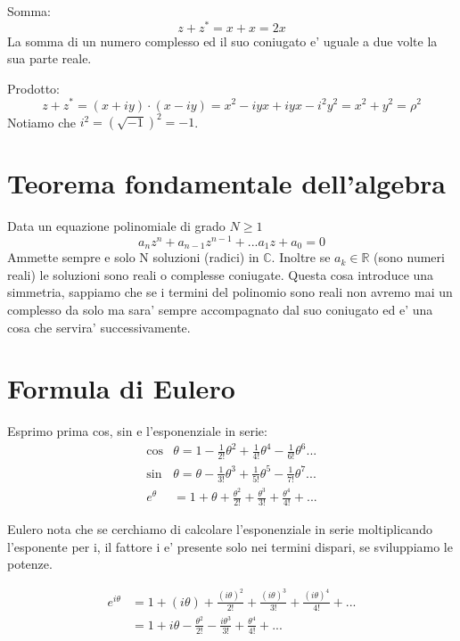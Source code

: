 Somma:
\begin{equation}
    z + z^* = x + x = 2x
\end{equation}
La somma di un numero complesso ed il suo coniugato e' uguale a due volte la sua parte reale.

Prodotto:
\begin{equation}
    z + z^* = (x + i y) \cdot (x - i y) = x^2 - i y x + i y x - i^2 y^2 = x^2 + y^2 = \rho^2
\end{equation}
Notiamo che $i^2 = (\sqrt{-1})^2 = -1$.

\section{Teorema fondamentale dell'algebra}
Data un equazione polinomiale di grado $N \ge 1$
\begin{equation}
    a_n z^n + a_{n-1} z ^ {n-1} + \mbox{...} a_1 z + a_0 = 0
\end{equation}
Ammette sempre e solo N soluzioni (radici) in $\mathbb C$.
Inoltre se $a_k \in \mathbb R$ (sono numeri reali) le soluzioni sono reali o complesse coniugate. Questa cosa introduce una simmetria, sappiamo che se i termini del polinomio sono reali non avremo mai un complesso da solo ma sara' sempre accompagnato dal suo coniugato ed e' una cosa che servira' successivamente.

\section{Formula di Eulero}
Esprimo prima cos, sin e l'esponenziale in serie:
\begin{equation}\begin{split}
    \cos& \theta = 1 - \frac{1}{2!} \theta^2 + \frac{1}{4!} \theta^4 - \frac{1}{6!} \theta^6 \mbox{...} \\
    \sin& \theta = \theta - \frac{1}{3!} \theta^3 + \frac{1}{5!} \theta^5 - \frac{1}{7!} \theta^7 \mbox{...} \\
    e^{\theta}& = 1 + \theta + \frac{\theta^2}{2!} + \frac{\theta^3}{3!} + \frac{\theta^4}{4!} + \mbox{...}
\end{split}\end{equation}

Eulero nota che se cerchiamo di calcolare l'esponenziale in serie moltiplicando l'esponente per i, il fattore i e' presente solo nei termini dispari, se sviluppiamo le potenze. 

\begin{equation}\begin{split}
    e^{i \theta}& = 1 + (i \theta) + \frac{(i \theta)^2}{2!} + \frac{(i \theta)^3}{3!} + \frac{(i \theta)^4}{4!} + \mbox{...} \\
    & = 1 + i \theta - \frac{\theta^2}{2!} - \frac{i \theta^3}{3!} + \frac{\theta^4}{4!} + \mbox{...}
\end{split}\end{equation}

